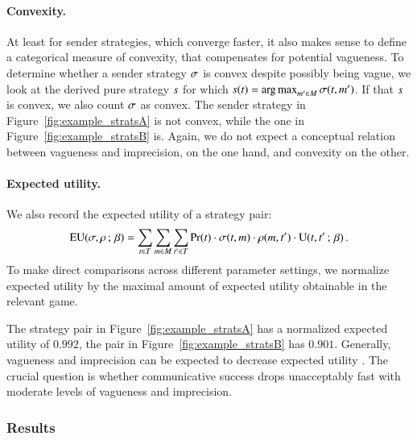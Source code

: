 \documentclass[fleqn,reqno,10pt]{article}
\newcommand{\toler}{\ensuremath{\beta}} %
\begin{document}
\paragraph{Convexity.} At least for sender strategies, which converge
faster, it also makes sense to define a categorical measure of
convexity, that compensates for potential vagueness. To determine
whether a sender strategy $\sigma$ is convex despite possibly being
vague, we look at the derived pure strategy $s$ for which
$s(t) = \operatorname*{arg\,max}_{m' \in M}
\sigma(t,m')$. If that $s$ is convex, we also count
$\sigma$ as convex. The sender strategy in
Figure~\ref{fig:example_stratsA} is not convex, while the one in
Figure~\ref{fig:example_stratsB} is. Again, we do not expect a
conceptual relation between vagueness and imprecision, on the one
hand, and convexity on the other.

\paragraph{Expected utility.} We also record the expected utility of
a strategy pair:
\begin{align*}
  \EU(\Sstrat,\Rstrat \myts ; \myts \toler) = \sum_{\state \in
    \States} \sum_{\messg \in \Messgs} \sum_{\state' \in \States}
  \Pr(\state) \cdot \Sstrat(\state, \messg) \cdot \Rstrat(\messg,
  \state') \cdot \Util(\state,\state' \myts ; \myts \toler)\,.
\end{align*}
To make direct comparisons across different parameter settings, we
normalize expected utility by the maximal amount of expected utility
obtainable in the relevant game. 

The strategy pair in Figure~\ref{fig:example_stratsA} has a normalized
expected utility of $0.992$, the pair in
Figure~\ref{fig:example_stratsB} has $0.901$. Generally, vagueness and
imprecision can be expected to decrease expected utility
\citep[c.f.][]{Lipman2009:Why-is-Language}. The crucial question is whether
communicative success drops unacceptably fast with moderate levels of
vagueness and imprecision.

\subsubsection{Results}
\end{document}
